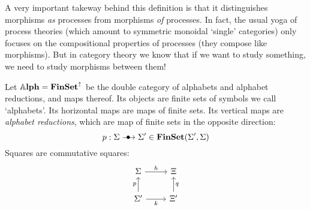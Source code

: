 A very important takeway behind this definition is that it distinguishes morphisms \emph{as} processes from morphisms \emph{of} processes.
In fact, the usual yoga of process theories (which amount to symmetric monoidal `single' categories) only focuses on the compositional properties of processes (they compose like morphisms).
But in category theory we know that if we want to study something, we need to study morphisms between them!

\begin{example}[Alphabets]
\label{ex:alphabets}
	Let $\Alph = \FinSet^\uparrow$ be the double category of alphabets and alphabet reductions, and maps thereof.
	Its objects are finite sets of symbols we call `alphabets'.
	Its horizontal maps are maps of finite sets.
	Its vertical maps are \emph{alphabet reductions}, which are map of finite sets in the opposite direction:
	\begin{equation}
		p : \Sigma \verto \Sigma' \in \FinSet(\Sigma', \Sigma)
	\end{equation}
	Squares are commutative squares:
	\begin{equation}
		\begin{tikzcd}[ampersand replacement=\&]
			\Sigma \& \Xi \\
			{\Sigma'} \& {\Xi'}
			\arrow["p", from=2-1, to=1-1]
			\arrow["q"', from=2-2, to=1-2]
			\arrow["h", from=1-1, to=1-2]
			\arrow["k"', from=2-1, to=2-2]
		\end{tikzcd}
	\end{equation}
\end{example}


